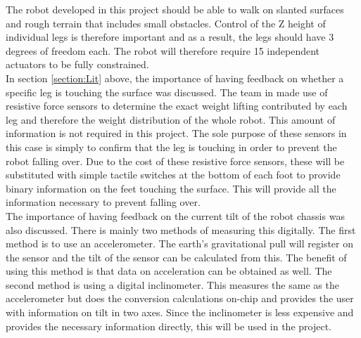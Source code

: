 The robot developed in this project should be able to walk on slanted surfaces and rough terrain that includes small obstacles. Control of the Z height of individual legs is therefore important and as a result, the legs should have 3 degrees of freedom each. The robot will therefore require 15 independent actuators to be fully constrained.\\

In section \ref{section:Lit} above, the importance of having feedback on whether a specific leg is touching the surface was discussed. The team in \cite{Ollervides:Navigation} made use of resistive force sensors to determine the exact weight lifting contributed by each leg and therefore the weight distribution of the whole robot. This amount of information is not required in this project. The sole purpose of these sensors in this case is simply to confirm that the leg is touching in order to prevent the robot falling over. Due to the cost of these resistive force sensors, these will be substituted with simple tactile switches at the bottom of each foot to provide binary information on the feet touching the surface. This will provide all the information necessary to prevent falling over.\\

The importance of having feedback on the current tilt of the robot chassis was also discussed. There is mainly two methods of measuring this digitally. The first method is to use an accelerometer. The earth's gravitational pull will register on the sensor and the tilt of the sensor can be calculated from this. The benefit of using this method is that data on acceleration can be obtained as well. The second method is using a digital inclinometer. This measures the same as the accelerometer but does the conversion calculations on-chip and provides the user with information on tilt in two axes. Since the inclinometer is less expensive and provides the necessary information directly, this will be used in the project.

\newpage

